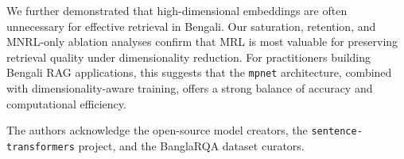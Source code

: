 \documentclass[manuscript,screen,review]{acmart}
\begin{document}
We further demonstrated that high-dimensional embeddings are often unnecessary for effective retrieval in Bengali. Our saturation, retention, and MNRL-only ablation analyses confirm that MRL is most valuable for preserving retrieval quality under dimensionality reduction. For practitioners building Bengali RAG applications, this suggests that the \texttt{mpnet} architecture, combined with dimensionality-aware training, offers a strong balance of accuracy and computational efficiency.

\begin{acks}
The authors acknowledge the open-source model creators, the \texttt{sentence-transformers} project, and the BanglaRQA dataset curators.
\end{acks}
\end{document}
